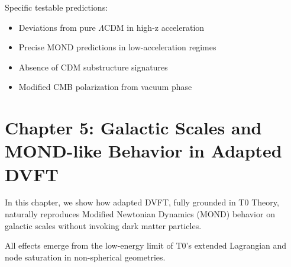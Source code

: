 \documentclass[12pt,a4paper]{article}
\begin{document}
	\begin{table}[htbp]
		\centering        {}
		\caption{Cosmological predictions comparison}
		\label{tab:cosmo}
	\end{table}
	
	Specific testable predictions:
	\begin{itemize}
		\item Deviations from pure $\Lambda$CDM in high-z acceleration
		\item Precise MOND predictions in low-acceleration regimes
		\item Absence of CDM substructure signatures
		\item Modified CMB polarization from vacuum phase
	\end{itemize}
	
	\section{Chapter 5: Galactic Scales and MOND-like Behavior in Adapted DVFT}
	
	In this chapter, we show how adapted DVFT, fully grounded in T0 Theory, naturally reproduces Modified Newtonian Dynamics (MOND) behavior on galactic scales without invoking dark matter particles.
	
	All effects emerge from the low-energy limit of T0's extended Lagrangian and node saturation in non-spherical geometries.
	
\end{document}

